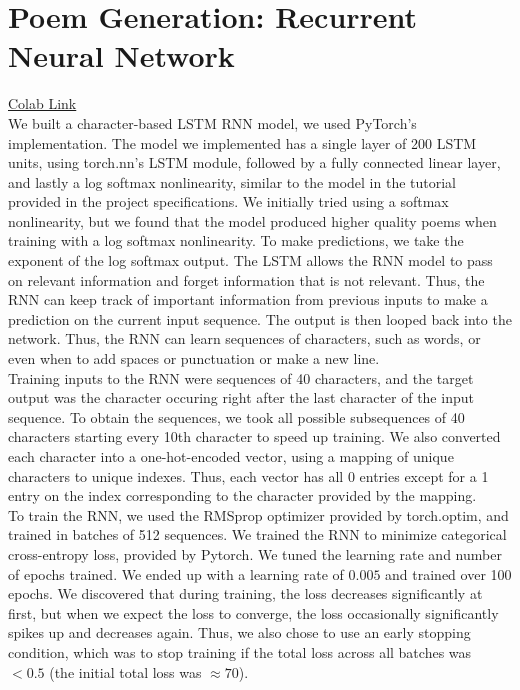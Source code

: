 \documentclass{article}
\begin{document}
\newpage
\section{Poem Generation: Recurrent Neural Network}
\href{https://colab.research.google.com/drive/10wlawrgl-Orz6RBJFQbeqVHr1Sl3VOs1?usp=sharing}{Colab Link}\\

We built a character-based LSTM RNN model, we used PyTorch's implementation. The model we implemented has a single layer of 200 LSTM units, using torch.nn's LSTM module, followed by a fully connected linear layer, and lastly a log softmax nonlinearity, similar to the model in the tutorial provided in the project specifications. We initially tried using a softmax nonlinearity, but we found that the model produced higher quality poems when training with a log softmax nonlinearity. To make predictions, we take the exponent of the log softmax output. The LSTM allows the RNN model to pass on relevant information and forget information that is not relevant. Thus, the RNN can keep track of important information from previous inputs to make a prediction on the current input sequence. The output is then looped back into the network. Thus, the RNN can learn sequences of characters, such as words, or even when to add spaces or punctuation or make a new line.\\

Training inputs to the RNN were sequences of 40 characters, and the target output was the character occuring right after the last character of the input sequence. To obtain the sequences, we took all possible subsequences of 40 characters starting every 10th character to speed up training. We also converted each character into a one-hot-encoded vector, using a mapping of unique characters to unique indexes. Thus, each vector has all 0 entries except for a 1 entry on the index corresponding to the character provided by the mapping.\\ 

To train the RNN, we used the RMSprop optimizer provided by torch.optim, and trained in batches of 512 sequences. We trained the RNN to minimize categorical cross-entropy loss, provided by Pytorch. We tuned the learning rate and number of epochs trained. We ended up with a learning rate of $0.005$ and trained over 100 epochs. We discovered that during training, the loss decreases significantly at first, but when we expect the loss to converge, the loss occasionally significantly spikes up and decreases again. Thus, we also chose to use an early stopping condition, which was to stop training if the total loss across all batches was $< 0.5$ (the initial total loss was $\approx 70$). \\
\end{document}
